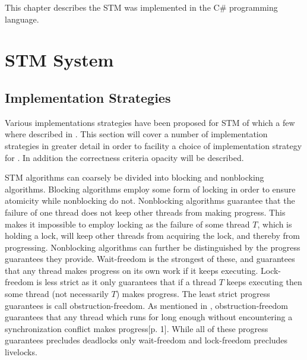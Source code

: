 \makeatletter {}\makeatother
{}
This chapter describes the \ac{STM} was implemented in the C\# programming language.
\label{chap:implementation}
\section{\acs{STM} System}
\subsection{Implementation Strategies}
Various implementations strategies have been proposed for \ac{STM} of which a few where described in . This section will cover a number of implementation strategies in greater detail in order to facility a choice of implementation strategy for \stmname. In addition the correctness criteria opacity will be described.

\ac{STM} algorithms can coarsely be divided into blocking and nonblocking algorithms\cite[p. 47]{harris2010transactional}. Blocking algorithms employ some form of locking in order to ensure atomicity while nonblocking do not\cite[p. 59]{herlihy2012art}. Nonblocking algorithms guarantee that the failure of one thread does not keep other threads from making progress\cite[p. 47]{harris2010transactional}\cite[p. 142]{herlihy1991wait}\cite[p. 59]{herlihy2012art}. This  makes it impossible to employ locking as the failure of some thread $T$, which is holding a lock, will keep other threads from acquiring the lock, and thereby from progressing. Nonblocking algorithms can further be distinguished by the progress guarantees they provide. Wait-freedom is the strongest of these, and guarantees that any thread makes progress on its own work if it keeps executing\cite[p. 124]{herlihy1991wait}\cite[p. 59]{herlihy2012art}. Lock-freedom is less strict as it only guarantees that if a thread $T$ keeps executing then some thread (not necessarily $T$) makes progress\cite[p. 47]{harris2010transactional}\cite[p. 60]{herlihy2012art}. The least strict progress guarantees is call obstruction-freedom\cite[p. 47]{harris2010transactional}\cite{herlihy2003obstruction}\cite[p. 61]{herlihy2012art}. As mentioned in , obstruction-freedom guarantees that any thread which runs for long enough without encountering a synchronization conflict makes progress\cite{herlihy2003obstruction}[p. 1]. While all of these progress guarantees precludes deadlocks only wait-freedom and lock-freedom precludes livelocks\cite[p. 47]{harris2010transactional}.

